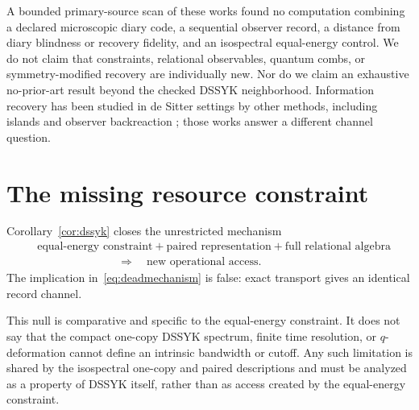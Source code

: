 \documentclass[11pt]{article}
\begin{document}
A bounded primary-source scan of these works found no computation combining a
declared microscopic diary code, a sequential observer record, a distance
from diary blindness or recovery fidelity, and an isospectral equal-energy
control.  We do not claim that constraints, relational observables, quantum
combs, or symmetry-modified recovery are individually new.  Nor do we claim
an exhaustive no-prior-art result beyond the checked DSSYK neighborhood.
Information recovery has been studied in de Sitter settings by other methods,
including islands and observer backreaction \citep{AalsmaSybesma}; those
works answer a different channel question.

\section{The missing resource constraint}
\label{sec:cutoff}

Corollary~\ref{cor:dssyk} closes the unrestricted mechanism
\begin{equation}
  \begin{aligned}
    &\text{equal-energy constraint}
      +\text{paired representation}
      +\text{full relational algebra}
      \\
    &\hspace{3cm}\Longrightarrow\quad
      \text{new operational access}.
  \end{aligned}
  \label{eq:deadmechanism}
\end{equation}
The implication in~\eqref{eq:deadmechanism} is false: exact transport gives an
identical record channel.

This null is comparative and specific to the equal-energy constraint.  It
does not say that the compact one-copy DSSYK spectrum, finite time resolution,
or $q$-deformation cannot define an intrinsic bandwidth or cutoff.  Any such
limitation is shared by the isospectral one-copy and paired descriptions and
must be analyzed as a property of DSSYK itself, rather than as access created
by the equal-energy constraint.
\end{document}
